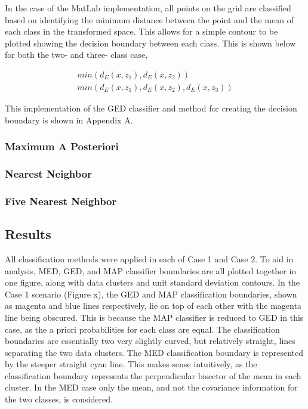 \documentclass[article, 1.5space, letterpaper, 12pt, oneside, header, footer]{SydeClass}
\begin{document}
In the case of the MatLab implementation, all points on the grid are classified based on identifying the minimum distance between the point and the mean of each class in the transformed space. This allows for a simple contour to be plotted showing the decision boundary between each class. This is shown below for both the two- and three- class case,

\begin{eqnarray}
\label{eqn:pointClass-GED}
min(d_{E} (x,z_{1}), d_{E} (x,z_{2})) \\
min(d_{E} (x,z_{1}), d_{E} (x,z_{2}), d_{E} (x,z_{3}))
\end{eqnarray}


This implementation of the GED classifier and method for creating the decision boundary is shown in Appendix A.

\subsubsection{Maximum A Posteriori}

\subsubsection{Nearest Neighbor}

\subsubsection{Five Nearest Neighbor}

\subsection{Results}
All classification methods were applied in each of Case 1 and Case 2. To aid in analysis, MED, GED, and MAP classifier boundaries are all plotted together in one figure, along with data clusters and unit standard deviation contours. In the Case 1 scenario (Figure x), the GED and MAP classification boundaries, shown as magenta and blue lines respectively, lie on top of each other with the magenta line being obscured. This is because the MAP classifier is reduced to GED in this case, as the a priori probabilities for each class are equal. The classification boundaries are essentially two very slightly curved, but relatively straight, lines separating the two data clusters. The MED classification boundary is represented by the steeper straight cyan line. This makes sense intuitively, as the classification boundary represents the perpendicular bisector of the mean in each cluster. In the MED case only the mean, and not the covariance information for the two classes, is considered.
\end{document}
